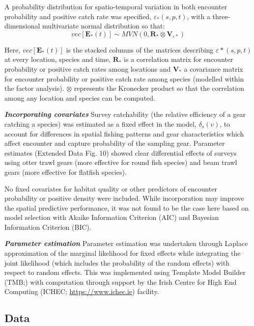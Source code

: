 \documentclass{nature}
\begin{document}
\begin{linenumbers}
A probability distribution for spatio-temporal variation in both encounter
probability and positive catch rate was specified, $\varepsilon_{*}(s,p,t)$,
with a three-dimensional multivariate normal distribution so that:
	\begin{equation}
		vec[\mathbf{E}_{*}(t)] \sim MVN(0,\mathbf{R}_{*} \otimes
		\mathbf{V}_{{\varepsilon}{*}})
	\end{equation}

Here, $vec[\mathbf{E}_{*}(t)]$ is the stacked columns of the matrices
describing $\varepsilon{*}(s,p,t)$ at every location, species and time,
$\mathbf{R}_{*}$ is a correlation matrix for encounter probability or positive
catch rates among locations and $\mathbf{V}_{*}$ a covariance matrix for
encounter probability or positive catch rate among species (modelled within the
factor analysis). $\otimes$ represents the Kronecker product so that the
correlation among any location and species can be computed\cite{Thorson2017}.
		
\textbf{\textit{Incorporating covariates}} Survey catchability (the relative
efficiency of a gear catching a species) was estimated as a fixed effect in the
model, $\delta_{s}(v)$, to account for differences in spatial fishing patterns
and gear characteristics which affect encounter and capture probability of the
sampling gear\cite{Thorson2014}. Parameter estimates (Extended Data Fig. 10)
showed clear differential effects of surveys using otter trawl gears (more
effective for round fish species) and beam trawl gears (more effective for
flatfish species).

No fixed covariates for habitat quality or other predictors of encounter
probability or positive density were included. While incorporation may improve
the spatial predictive performance\cite{Thorson2017}, it was not found to be
the case here based on model selection with Akaike Information Criterion (AIC)
and Bayesian Information Criterion (BIC).

\textbf{\textit{Parameter estimation}} Parameter estimation was undertaken
through Laplace approximation of the marginal likelihood for fixed effects
while integrating the joint likelihood (which includes the probability of the
random effects) with respect to random effects. This was implemented using
Template Model Builder (TMB;\cite{Kristensen2015}) with computation through
support by the Irish Centre for High End Computing (ICHEC;
\url{https://www.ichec.ie}) facility.  

\subsection{Data}


\end{linenumbers}
\end{document}
